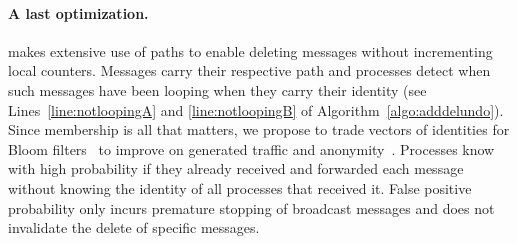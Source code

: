 

\paragraph{A last optimization.}
\NAME makes extensive use of paths to enable deleting messages without
incrementing local counters. Messages carry their respective path and
processes detect when such messages have been looping when they carry
their identity (see Lines~\ref{line:notloopingA} and
\ref{line:notloopingB} of Algorithm~\ref{algo:adddelundo}). Since
membership is all that matters, we propose to trade vectors of
identities for Bloom filters~\cite{almeida2007scalable} to improve on
generated traffic and
anonymity~\cite{whitaker2002forwarding}. Processes know with high
probability if they already received and forwarded each message
without knowing the identity of all processes that received it.  False
positive probability only incurs premature stopping of broadcast
messages and does not invalidate the delete of specific messages.









